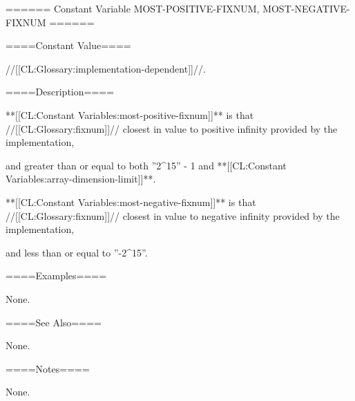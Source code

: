 ====== Constant Variable MOST-POSITIVE-FIXNUM, MOST-NEGATIVE-FIXNUM ======

====Constant Value====

//[[CL:Glossary:implementation-dependent]]//.

====Description====

**[[CL:Constant Variables:most-positive-fixnum]]** is that //[[CL:Glossary:fixnum]]// closest in value to positive infinity provided by the implementation,

and greater than or equal to both ''2^{15}'' - 1 and **[[CL:Constant Variables:array-dimension-limit]]**.

**[[CL:Constant Variables:most-negative-fixnum]]** is that //[[CL:Glossary:fixnum]]// closest in value to negative infinity provided by the implementation,

and less than or equal to ''-2^{15}''.

====Examples====

None.

====See Also====

None.

====Notes====

None.

 
